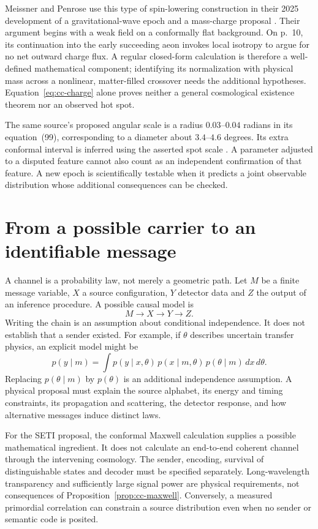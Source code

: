 Meissner and Penrose use this type of spin-lowering construction in their
2025 development of a gravitational-wave epoch and a mass-charge proposal
\citep[Secs.~II--III]{CCMeissnerPenrose2025}. Their argument begins with a
weak field on a conformally flat background. On p.~10, its continuation
into the early succeeding aeon invokes local isotropy to argue for no
net outward charge flux. A regular closed-form calculation is therefore
a well-defined mathematical component; identifying its normalization
with physical mass across a nonlinear, matter-filled crossover needs
the additional hypotheses. Equation~\eqref{eq:cc-charge} alone proves
neither a general cosmological existence theorem nor an observed hot spot.

The same source's proposed angular scale is a radius
$0.03$--$0.04$ radians in its equation~(99), corresponding to a diameter
about $3.4$--$4.6$ degrees. Its extra conformal interval is inferred using
the asserted spot scale \citep[Sec.~VI.B]{CCMeissnerPenrose2025}. A parameter
adjusted to a disputed feature cannot also count as an independent
confirmation of that feature. A new epoch is scientifically testable
when it predicts a joint observable distribution whose additional
consequences can be checked.

\section{From a possible carrier to an identifiable message}

A channel is a probability law, not merely a geometric path. Let $M$ be
a finite message variable, $X$ a source configuration, $Y$ detector data
and $Z$ the output of an inference procedure. A possible causal model is
\begin{equation}
 M\longrightarrow X\longrightarrow Y\longrightarrow Z.
 \label{eq:cc-markov}
\end{equation}
Writing the chain is an assumption about conditional independence. It
does not establish that a sender existed. For example, if $\theta$
describes uncertain transfer physics, an explicit model might be
\[
 p(y\mid m)=\int p(y\mid x,\theta)\,
 p(x\mid m,\theta)\,p(\theta\mid m)\,dx\,d\theta.
\]
Replacing $p(\theta\mid m)$ by $p(\theta)$ is an additional independence
assumption. A physical proposal must explain the source alphabet, its
energy and timing constraints, its propagation and scattering, the
detector response, and how alternative messages induce distinct laws.

For the SETI proposal, the conformal Maxwell calculation supplies a
possible mathematical ingredient. It does not calculate an end-to-end
coherent channel through the intervening cosmology. The sender,
encoding, survival of distinguishable states and decoder must be
specified separately. Long-wavelength transparency and sufficiently
large signal power are physical requirements, not consequences of
Proposition~\ref{prop:cc-maxwell}. Conversely, a measured primordial
correlation can constrain a source distribution even when no sender or
semantic code is posited.

